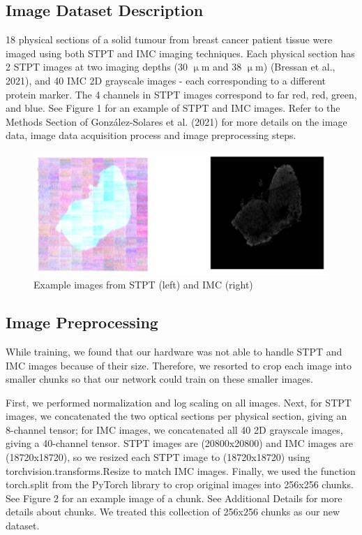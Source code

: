 \documentclass[10pt,twocolumn,letterpaper]{article}
\begin{document}
\subsection{Image Dataset Description}

18 physical sections of a solid tumour from breast cancer patient tissue were imaged using both STPT and IMC imaging techniques. Each physical section has 2 STPT  images at two imaging depths (30 $\upmu$m and 38 $\upmu$m) (Bressan et al., 2021), and 40 IMC 2D grayscale images - each corresponding to a different protein marker. The 4 channels in STPT images correspond to far red, red, green, and blue. See Figure 1 for an example of STPT and IMC images. Refer to the Methods Section of González-Solares et al. (2021) for more details on the image data, image data acquisition process and image preprocessing steps. 

\begin{figure}
	\centering
	\captionsetup{justification=centering}
		\hspace*{-0.2cm}	
		\includegraphics[scale=0.35]{../figures/imc_stpt_img4report.png}
	\caption{Example images from STPT (left) and IMC (right)}		
\end{figure}

\subsection{Image Preprocessing}

While training, we found that our hardware was not able to handle STPT and IMC images because of their size. Therefore, we resorted to crop each image into smaller chunks so that our network could train on these smaller images. 

First, we performed normalization and log scaling on all images. Next, for STPT images, we concatenated the two optical sections per physical section, giving an 8-channel tensor; for IMC images, we concatenated all 40 2D grayscale images, giving a 40-channel tensor. STPT images are (20800x20800) and IMC images are (18720x18720), so we resized each STPT image to (18720x18720) using torchvision.transforms.Resize to match IMC images. Finally, we used the function torch.split from the PyTorch library to crop original images into 256x256 chunks. See Figure 2 for an example image of a chunk. See Additional Details for more details about chunks. We treated this collection of 256x256 chunks as our new dataset. 
\end{document}

